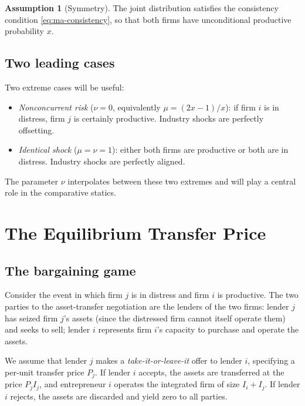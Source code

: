 \documentclass[11pt,a4paper,oneside]{book}
\theoremstyle{plain}
\theoremstyle{definition}
\newtheorem{assumption}[theorem]{Assumption}
\theoremstyle{remark}
\numberwithin{equation}{chapter}
\begin{document}
\begin{assumption}[Symmetry]\label{ass:ma-symmetry}
The joint distribution satisfies the consistency condition \eqref{eq:ma-consistency}, so that both firms have unconditional productive probability $x$.
\end{assumption}

\subsection{Two leading cases}

Two extreme cases will be useful:

\begin{itemize}
  \item \emph{Nonconcurrent risk} ($\nu = 0$, equivalently $\mu = (2x - 1)/x$): if firm $i$ is in distress, firm $j$ is certainly productive.
  Industry shocks are perfectly offsetting.
  \item \emph{Identical shock} ($\mu = \nu = 1$): either both firms are productive or both are in distress.
  Industry shocks are perfectly aligned.
\end{itemize}
The parameter $\nu$ interpolates between these two extremes and will play a central role in the comparative statics.

\section{The Equilibrium Transfer Price}
\label{sec:ma-transfer}

\subsection{The bargaining game}

Consider the event in which firm $j$ is in distress and firm $i$ is productive.
The two parties to the asset-transfer negotiation are the lenders of the two firms: lender $j$ has seized firm $j$'s assets (since the distressed firm cannot itself operate them) and seeks to sell; lender $i$ represents firm $i$'s capacity to purchase and operate the assets.

We assume that lender $j$ makes a \emph{take-it-or-leave-it} offer to lender $i$, specifying a per-unit transfer price $P_j$.
If lender $i$ accepts, the assets are transferred at the price $P_j I_j$, and entrepreneur $i$ operates the integrated firm of size $I_i + I_j$.
If lender $i$ rejects, the assets are discarded and yield zero to all parties.
\end{document}
